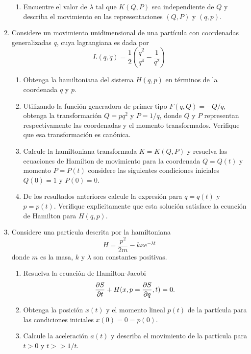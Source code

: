 \documentclass[../main]{subfiles}
\begin{document}
\begin{enumerate}
\begin{enumerate}[label=(\alph*)]
        \item Encuentre el valor de $\lambda$ tal que $K(Q, P)$ sea independiente de $Q$ y describa el movimiento en las representaciones $(Q, P)$ y $(q, p)$.
    \end{enumerate}
    \item Considere un movimiento unidimensional de una partícula con coordenadas generalizadas $q$, cuya lagrangiana es dada por 
    \begin{equation*}
        L(q, \dot{q})=\dfrac{1}{2}\left(\dfrac{\dot{q}^2}{q^4}-\dfrac{1}{q^2}\right)
    \end{equation*}
    \begin{enumerate}[label=(\alph*)]
        \item Obtenga la hamiltoniana del sistema $H(q, p)$ en términos de la coordenada $q$ y $p$.
        \item Utilizando la función generadora de primer tipo $F(q, Q)=-Q/q$, obtenga la transformación $Q=pq^2$ y $P=1/q$, donde $Q$ y $P$ representan respectivamente las coordenadas y el momento transformados. Verifique que esa transformación es canónica.
        \item Calcule la hamiltoniana transformada $K=K(Q, P)$ y resuelva las ecuaciones de Hamilton de movimiento para la coordenada $Q=Q(t)$ y momento $P=P(t)$ considere las siguientes condiciones iniciales $Q(0)=1$ y $P(0)=0$.
        \item De los resultados anteriores calcule la expresión para $q=q(t)$ y $p=p(t)$. Verifique explicitamente que esta solución satisface la ecuación de Hamilton para $H(q, p)$.
    \end{enumerate}
    \item Considere una partícula descrita por la hamiltoniana
    \begin{equation*}
        H=\dfrac{p^2}{2m}-kxe^{-\lambda t}
    \end{equation*}
    donde $m$ es la masa, $k$ y $\lambda$ son constantes positivas.
    \begin{enumerate}[label=(\alph*)]
        \item Resuelva la ecuación de Hamilton-Jacobi 
        \begin{equation*}
            \pdv{S}{t}+H(x, p=\pdv{S}{q}, t)=0.
        \end{equation*}
        \item Obtenga la posición $x(t)$ y el momento lineal $p(t)$ de la partícula para las condiciones iniciales $x(0)=0=p(0)$.
        \item Calcule la aceleración $a(t)$ y describa el movimiento de la partícula para $t>0$ y $t>>1/t$.

\end{enumerate}
\end{enumerate}
\end{document}
